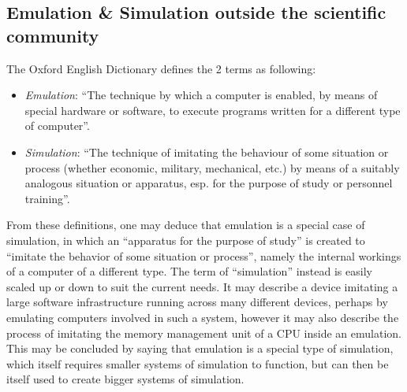 \subsection{Emulation \& Simulation outside the scientific community}
The Oxford English Dictionary defines the 2 terms as following:
\begin{itemize}
    \item \emph{Emulation}: \enquote{The technique by which a
    computer is enabled, by means of special
    hardware or software, to execute programs
    written for a different type of computer}\cite[p. 196]{emulation_oxford}.
    \item \emph{Simulation}: \enquote{The technique of imitating the behaviour of
    some situation or process (whether economic,
    military, mechanical, etc.) by means of a
    suitably analogous situation or apparatus, esp.
    for the purpose of study or personnel training}\cite[p.503]{simulation_oxford}.
\end{itemize}
From these definitions, one may deduce that emulation is a special case of simulation,
in which an \enquote{apparatus for the purpose of study} is created to \enquote{imitate the behavior of some situation or process},
namely the internal workings of a computer of a different type.
The term of \enquote{simulation} instead is easily scaled up or down to suit the current needs.
It may describe a device imitating a large software infrastructure running across many different devices,
perhaps by emulating computers involved in such a system,
however it may also describe the process of imitating the memory management unit of a CPU inside an emulation.
This may be concluded by saying that emulation is a special type of simulation,
which itself requires smaller systems of simulation to function,
but can then be itself used to create bigger systems of simulation.

